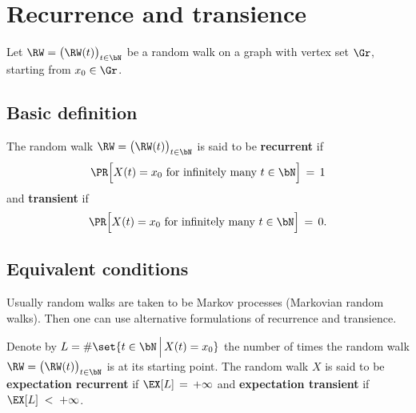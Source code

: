 \chapter{Recurrence and transience}

Let $\RW = \big(\RW(t)\big)_{t \in \bN}$ be a random walk on a graph with
vertex set $\Gr$, starting from $x_0 \in \Gr$.

\section{Basic definition}

\begin{definition}%
  \label{def:recurrence}
  The random walk $\RW = \big(\RW(t)\big)_{t \in \bN}$
  is said to be \textbf{recurrent} if
  \begin{align*}
  \PR\Big[ X(t) = x_0 \text{ for infinitely many } t \in \bN \Big] \, = \, 1
  \end{align*}
  and \textbf{transient} if
  \begin{align*}
  \PR\Big[ X(t) = x_0 \text{ for infinitely many } t \in \bN \Big] \, = \, 0 .
  \end{align*}

\end{definition}

\section{Equivalent conditions}

Usually random walks are taken to be Markov processes (Markovian random walks).
Then one can use alternative formulations of recurrence and transience.

\begin{definition}%
  \label{def:expectation_recurrence}
  Denote by
  $L = \# \set{t \in \bN \, \Big| \, X(t) = x_0}$ the number of times
  the random walk $\RW = \big(\RW(t)\big)_{t \in \bN}$ is at its starting point.
  The random walk $X$ is said to be \textbf{expectation recurrent} if
  $\EX [ L ] \, = \, +\infty$
  and \textbf{expectation transient} if
  $\EX [ L ] \; < \; +\infty$.
\end{definition}

